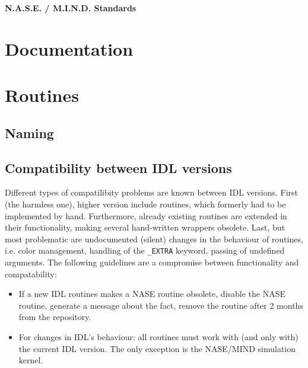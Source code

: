 \documentclass[12pt]{article}
\begin{document}
{\Huge\textbf{N.A.S.E. / M.I.N.D. Standards}}

\section{Documentation}

\section{Routines}
\subsection{Naming}
\subsection{Compatibility between IDL versions}
Different types of compatilibity problems are known between IDL versions. First (the harmless one), higher version include routines, which formerly had to be implemented by hand. Furthermore, already existing routines are extended in their functionality, making several hand-written wrappers obsolete. Last, but most problematic are undocumented (silent) changes in the behaviour of routines, i.e. color management, handling of the \texttt{\_EXTRA} keyword, passing of undefined arguments. The following guidelines are a compromise between functionality and compatability:
\begin{itemize}
\item If a new IDL routines makes a NASE routine obsolete, disable the NASE routine, generate a message about the fact, remove the routine after 2 months from the repository.
\item For changes in IDL's behaviour: all routines must work with (and only with) the current IDL version. The only exception is the NASE/MIND simulation kernel.
\end{itemize}
\end{document}
